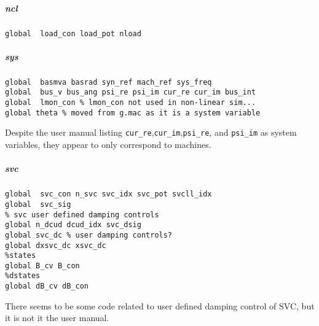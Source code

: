 \documentclass[12pt]{article}
\begin{document}
\subparagraph{ncl}
\begin{verbatim}
global  load_con load_pot nload
\end{verbatim}
\subparagraph{sys}
\begin{verbatim}
global  basmva basrad syn_ref mach_ref sys_freq
global  bus_v bus_ang psi_re psi_im cur_re cur_im bus_int
global  lmon_con % lmon_con not used in non-linear sim...
global theta % moved from g.mac as it is a system variable
\end{verbatim}
Despite the user manual listing \verb|cur_re|,\verb|cur_im|,\verb|psi_re|, and \verb|psi_im| as system variables, they appear to only correspond to machines.
\subparagraph{svc}
\begin{verbatim}
global  svc_con n_svc svc_idx svc_pot svcll_idx
global  svc_sig
% svc user defined damping controls
global n_dcud dcud_idx svc_dsig
global svc_dc % user damping controls?
global dxsvc_dc xsvc_dc
%states
global B_cv B_con
%dstates
global dB_cv dB_con
\end{verbatim}
There seems to be some code related to user defined damping control of SVC, but it is not it the user manual.

\begin{comment}

\subparagraph{xxx}
\begin{verbatim}

\end{verbatim}


\end{comment}
\end{document}
